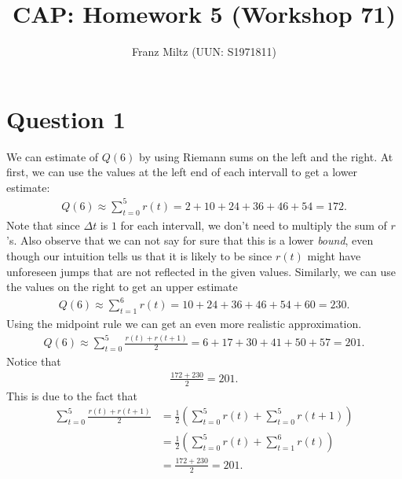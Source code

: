 \documentclass{article}
\title{CAP: Homework 5 (Workshop 71)}
\author{Franz Miltz (UUN: S1971811)}
\begin{document}
\maketitle
\section*{Question 1}
We can estimate of $Q(6)$ by using Riemann sums on the left and the right.
At first, we can use the values at the left end of each intervall to get a lower estimate:
\begin{align*}
  Q(6) \approx \sum_{t=0}^5 r(t)=2 + 10 + 24 +36 + 46+54=172.
\end{align*}
Note that since $\Delta t$ is $1$ for each intervall, we don't need to multiply the sum of $r$'s.
Also observe that we can not say for sure that this is a lower \emph{bound}, even though our intuition tells us that it is likely to be since $r(t)$ might have unforeseen jumps that are not reflected in the given values.
Similarly, we can use the values on the right to get an upper estimate
\begin{align*}
  Q(6) \approx \sum_{t=1}^6 r(t)=10+24+36+46+54+60=230.
\end{align*}
Using the midpoint rule we can get an even more realistic approximation.
\begin{align*}
  Q(6)\approx \sum_{t=0}^5 \frac{r(t)+r(t+1)}{2}=6+17+30+41+50+57=201.
\end{align*}
Notice that
\begin{align*}
  \frac{172+230}{2}=201.
\end{align*}
This is due to the fact that
\begin{align*}
  \sum_{t=0}^5\frac{r(t)+r(t+1)}{2}
   & =\frac{1}{2}\left(\sum_{t=0}^5 r(t)+\sum_{t=0}^5 r(t+1)\right) \\
   & =\frac{1}{2}\left(\sum_{t=0}^5 r(t)+\sum_{t=1}^6 r(t)\right)   \\
   & =\frac{172+230}{2}=201.
\end{align*}
\end{document}

